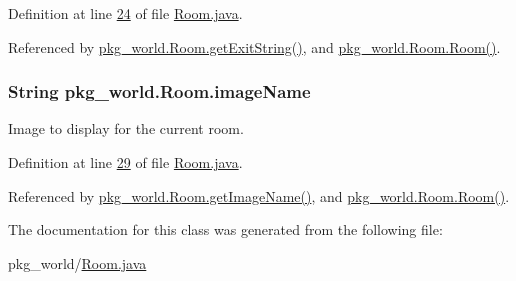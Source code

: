 Definition at line \hyperlink{Room_8java_source_l00024}{24} of file \hyperlink{Room_8java_source}{Room.\-java}.



Referenced by \hyperlink{Room_8java_source_l00158}{pkg\-\_\-world.\-Room.\-get\-Exit\-String()}, and \hyperlink{Room_8java_source_l00051}{pkg\-\_\-world.\-Room.\-Room()}.

\hypertarget{classpkg__world_1_1Room_a5d803cae18b95d7a4fc5243fd13ae236}{
\subsubsection[{image\-Name}]{\setlength{\rightskip}{0pt plus 5cm}String pkg\-\_\-world.\-Room.\-image\-Name\hspace{0.3cm}{\ttfamily [private]}}}\label{classpkg__world_1_1Room_a5d803cae18b95d7a4fc5243fd13ae236}


Image to display for the current room. 



Definition at line \hyperlink{Room_8java_source_l00029}{29} of file \hyperlink{Room_8java_source}{Room.\-java}.



Referenced by \hyperlink{Room_8java_source_l00187}{pkg\-\_\-world.\-Room.\-get\-Image\-Name()}, and \hyperlink{Room_8java_source_l00051}{pkg\-\_\-world.\-Room.\-Room()}.



The documentation for this class was generated from the following file\-:\begin{DoxyCompactItemize}
\item 
pkg\-\_\-world/\hyperlink{Room_8java}{Room.\-java}\end{DoxyCompactItemize}
